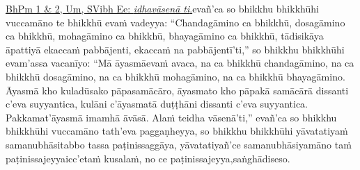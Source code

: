 {{{		\hypertarget{endnote96-appendix}{\hyperlink{endnote96-body}{BhPm 1 \& 2, Um, SVibh Ee: \textit{idhavāsenā ti}.}}}}}\makeatother \thinspace evañ'ca so bhikkhu bhikkhūhi vuccamāno te bhikkhū evaṁ vadeyya: ``Chandagāmino ca bhikkhū, dosagāmino ca bhikkhū, mohagāmino ca bhikkhū, bhayagāmino ca bhikkhū, tādisikāya āpattiyā ekaccaṁ pabbājenti, ekaccaṁ na pabbājentī'ti,'' so bhikkhu bhikkhūhi evam'assa vacanīyo: ``Mā āyasmā\makeatletter\hyperlink{endnote97-appendix}\makeatother \thinspace evaṁ avaca, na ca bhikkhū chandagāmino, na ca bhikkhū dosagāmino, na ca bhikkhū mohagāmino, na ca bhikkhū bhayagāmino. Āyasmā kho kuladūsako pāpasamācāro, āyasmato kho pāpakā samācārā dissanti c'eva suyyanti\makeatletter\hyperlink{endnote98-appendix}\makeatother \thinspace ca, kulāni c'āyasmatā duṭṭhāni dissanti c'eva suyyanti\makeatletter\hyperlink{endnote99-appendix}\makeatother \thinspace ca. Pakkamat'āyasmā imamhā āvāsā. Alaṁ te\makeatletter\hyperlink{endnote100-appendix}\makeatother \thinspace idha vāsenā'ti,'' evañ'ca so bhikkhu bhikkhūhi vuccamāno tath'eva paggaṇheyya, so bhikkhu bhikkhūhi yāvatatiyaṁ samanubhāsitabbo tassa paṭinissaggāya, yāvatatiyañ'ce samanubhāsiyamāno taṁ paṭinissajeyya\makeatletter\hyperlink{endnote101-appendix}\makeatother \thinspace icc'etaṁ kusalaṁ, no ce paṭinissajeyya,\makeatletter\hyperlink{endnote102-appendix}\makeatother \thinspace saṅghādiseso.



